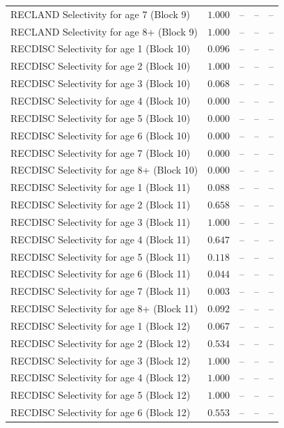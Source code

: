 \documentclass[
]{article}
\begin{document}
\begin{landscape}
\begin{longtable}[t]{lrrrr}
RECLAND Selectivity for age 7 (Block 9) & $1.000$ & -- & -- & --\\
RECLAND Selectivity for age 8+ (Block 9) & $1.000$ & -- & -- & --\\
RECDISC Selectivity for age 1 (Block 10) & $0.096$ & -- & -- & --\\
RECDISC Selectivity for age 2 (Block 10) & $1.000$ & -- & -- & --\\
\addlinespace
RECDISC Selectivity for age 3 (Block 10) & $0.068$ & -- & -- & --\\
RECDISC Selectivity for age 4 (Block 10) & $0.000$ & -- & -- & --\\
RECDISC Selectivity for age 5 (Block 10) & $0.000$ & -- & -- & --\\
RECDISC Selectivity for age 6 (Block 10) & $0.000$ & -- & -- & --\\
RECDISC Selectivity for age 7 (Block 10) & $0.000$ & -- & -- & --\\
\addlinespace
RECDISC Selectivity for age 8+ (Block 10) & $0.000$ & -- & -- & --\\
RECDISC Selectivity for age 1 (Block 11) & $0.088$ & -- & -- & --\\
RECDISC Selectivity for age 2 (Block 11) & $0.658$ & -- & -- & --\\
RECDISC Selectivity for age 3 (Block 11) & $1.000$ & -- & -- & --\\
RECDISC Selectivity for age 4 (Block 11) & $0.647$ & -- & -- & --\\
\addlinespace
RECDISC Selectivity for age 5 (Block 11) & $0.118$ & -- & -- & --\\
RECDISC Selectivity for age 6 (Block 11) & $0.044$ & -- & -- & --\\
RECDISC Selectivity for age 7 (Block 11) & $0.003$ & -- & -- & --\\
RECDISC Selectivity for age 8+ (Block 11) & $0.092$ & -- & -- & --\\
RECDISC Selectivity for age 1 (Block 12) & $0.067$ & -- & -- & --\\
\addlinespace
RECDISC Selectivity for age 2 (Block 12) & $0.534$ & -- & -- & --\\
RECDISC Selectivity for age 3 (Block 12) & $1.000$ & -- & -- & --\\
RECDISC Selectivity for age 4 (Block 12) & $1.000$ & -- & -- & --\\
RECDISC Selectivity for age 5 (Block 12) & $1.000$ & -- & -- & --\\
RECDISC Selectivity for age 6 (Block 12) & $0.553$ & -- & -- & --\\

\end{longtable}
\end{landscape}
\end{document}
